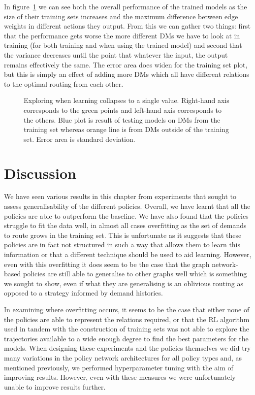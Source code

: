 In figure~\ref{fig:exp_fail} we can see both the overall performance of the trained models as the size of their training sets increases and the maximum difference between edge weights in different actions they output. From this we can gather two things: first that the performance gets worse the more different DMs we have to look at in training (for both training and when using the trained model) and second that the variance decreases until the point that whatever the input, the output remains effectively the same. The error area does widen for the training set plot, but this is simply an effect of adding more DMs which all have different relations to the optimal routing from each other.

\begin{figure}
    \centering
    
    \caption{Exploring when learning collapses to a single value. Right-hand axis corresponds to the green points and left-hand axis corresponds to the others. Blue plot is result of testing models on DMs from the training set whereas orange line is from DMs outside of the training set. Error area is standard deviation.}
    \label{fig:exp_fail}
\end{figure}


\section{Discussion}
We have seen various results in this chapter from experiments that sought to assess generalisability of the different policies. Overall, we have learnt that all the policies are able to outperform the baseline. We have also found that the policies struggle to fit the data well, in almost all cases overfitting as the set of demands to route grows in the training set. This is unfortunate as it suggests that these policies are in fact not structured in such a way that allows them to learn this information or that a different technique should be used to aid learning. However, even with this overfitting it does seem to be the case that the graph network-based policies are still able to generalise to other graphs well which is something we sought to show, even if what they are generalising is an oblivious routing as opposed to a strategy informed by demand histories.

In examining where overfitting occurs, it seems to be the case that either none of the policies are able to represent the relations required, or that the RL algorithm used in tandem with the construction of training sets was not able to explore the trajectories available to a wide enough degree to find the best parameters for the models. When designing these experiments and the policies themselves we did try many variations in the policy network architectures for all policy types and, as mentioned previously, we performed hyperparameter tuning with the aim of improving results. However, even with these measures we were unfortunately unable to improve results further.

